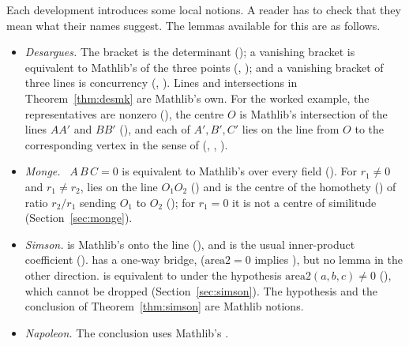 \documentclass[11pt]{article}
\theoremstyle{definition}
\theoremstyle{remark}
\begin{document}
Each development introduces some local notions. A reader has to check that they mean what their
names suggest. The lemmas available for this are as follows.
\begin{itemize}
\item \emph{Desargues.} The bracket is the determinant (); a vanishing
bracket is equivalent to Mathlib's  of the three points
(, );
and a vanishing bracket of three lines is concurrency
(,
). Lines and intersections in
Theorem~\ref{thm:desmk} are Mathlib's own. For the worked example, the representatives are nonzero
(), the centre $O$ is Mathlib's intersection
 of the lines $AA'$ and $BB'$ (), and
each of $A',B',C'$ lies on the line from $O$ to the corresponding vertex in the sense of
 (,
, ).
\item \emph{Monge.} ~$A\,B\,C=0$ is equivalent to Mathlib's  over
every field (). For $r_1\ne0$ and $r_1\ne r_2$,
 lies on the line $O_1O_2$ () and is the centre of the
homothety () of ratio $r_2/r_1$ sending $O_1$ to $O_2$
(); for $r_1=0$ it is not a centre of similitude
(Section~\ref{sec:monge}).
\item \emph{Simson.}  is Mathlib's
 onto the line
(), and  is the usual
inner-product coefficient ().  has a one-way
bridge,  ($\mathrm{area2}=0$ implies ), but
no lemma in the other direction.  is equivalent to  under
the hypothesis $\mathrm{area2}(a,b,c)\ne0$ (), which
cannot be dropped (Section~\ref{sec:simson}). The hypothesis and the conclusion of
Theorem~\ref{thm:simson} are Mathlib notions.
\item \emph{Napoleon.} The conclusion uses Mathlib's .

\end{itemize}
\end{document}
